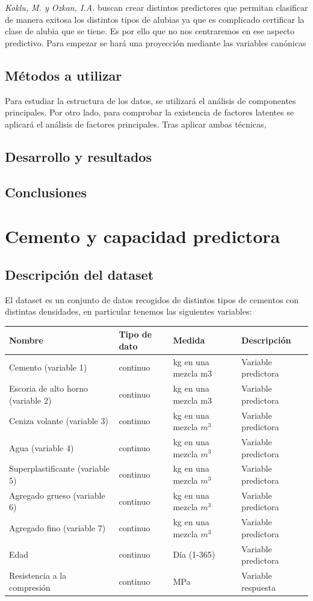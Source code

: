 \noindent  \emph{Koklu, M. y Ozkan, I.A.}\cite{Koklu 2020} buscan crear distintos predictores que permitan clasificar de manera exitosa los distintos tipos de alubias ya que es complicado certificar la clase de alubia que se tiene. Es por ello que no nos centraremos en ese aspecto predictivo. Para empezar se hará una proyección mediante las variables canónicas 

\subsection*{Métodos a utilizar}
\noindent Para estudiar la estructura de los datos, se utilizará el análisis de componentes principales. Por otro lado, para comprobar la existencia de factores latentes se aplicará el análisis de factores principales. Tras aplicar ambas técnicas,
\subsection*{Desarrollo y resultados}
\subsection*{Conclusiones}

\newpage
\section{Cemento y capacidad predictora}

\subsection*{Descripción del dataset}
\noindent El dataset  \cite{Yeh 2007} es un conjunto de datos recogidos de distintos tipos de cementos con distintas densidades, en particular tenemos las siguientes variables:
\begin{table}[h]
\footnotesize
\centering
\begin{tabular}{|l|l|l|l|}
\hline
Nombre & Tipo de dato & Medida & Descripción \\
\hline
Cemento (variable 1) & continuo & kg en una mezcla m3 & Variable predictora \\
Escoria de alto horno (variable 2) & continuo & kg en una mezcla m3 & Variable predictora \\
Ceniza volante (variable 3) & continuo & kg en una mezcla $m^3$ & Variable predictora \\
Agua (variable 4) & continuo & kg en una mezcla $m^3$ & Variable predictora \\
Superplastificante (variable 5) & continuo & kg en una mezcla $m^3$ & Variable predictora \\
Agregado grueso (variable 6) & continuo & kg en una mezcla $m^3$ & Variable predictora \\
Agregado fino (variable 7) & continuo & kg en una mezcla $m^3$ & Variable predictora \\
Edad & continuo & Día (1-365) & Variable predictora \\
Resistencia a la compresión & continuo & MPa & Variable respuesta \\
\hline
\end{tabular}
\end{table}

